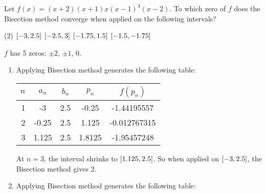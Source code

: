 \documentclass[../../../../Assignments.tex]{subfiles}
\begin{document}
\begin{exercise}
    Let \(f(x) = (x + 2) (x+1) x (x - 1)^3 (x - 2)\). To which zero of \(f\)
    does the Bisection method converge when applied on the following intervals?

    \begin{tasks}(2)
        \task \(\interval{-3}{\num{2.5}}\)
        \task \(\interval{\num{-2.5}}{3}\)
        \task \(\interval{\num{-1.75}}{\num{1.5}}\)
        \task \(\interval{\num{-1.5}}{\num{-1.75}}\)
    \end{tasks}
\end{exercise}

\begin{solution}
    \(f\) has 5 zeros: \(\pm 2\), \(\pm 1\), \(0\).

    \begin{enumerate}[label = (\alph*)]
        \item Applying Bisection method generates the following table:

            \begin{table}[H]
                \centering
                \begin{tabular}{r S[table-format=-1.3] S[table-format=1.1] S[table-format=-1.4] S[table-format=-1.9]}
                    \toprule
                    \(n\)  &   {\(a_n\)}   &   {\(b_n\)}   &   {\(p_n\)}   &  {\(f(p_n)\)}  \\
                      &  -3           &  2.5          &  -0.25        &  -1.44195557   \\
                        2  &  -0.25        &  2.5          &   1.125       &  -0.012767315  \\
                        3  &   1.125       &  2.5          &   1.8125      &  -1.95457248   \\
                    \bottomrule
                \end{tabular}
            \end{table}

            At \(n = 3\), the interval shrinks to
            \(\interval{\num{1.125}}{\num{2.5}}\). So when applied on
            \(\interval{-3}{\num{2.5}}\), the Bisection method gives \(2\).

        \item Applying Bisection method generates the following table:


\end{enumerate}
\end{solution}
\end{document}
